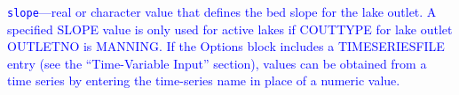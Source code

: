 \begin{description}
\item \textcolor{blue}{\texttt{slope}---real or character value that defines the bed slope for the lake outlet. A specified SLOPE value is only used for active lakes if COUTTYPE for lake outlet OUTLETNO is MANNING. If the Options block includes a TIMESERIESFILE entry (see the ``Time-Variable Input'' section), values can be obtained from a time series by entering the time-series name in place of a numeric value.}

\end{description}

